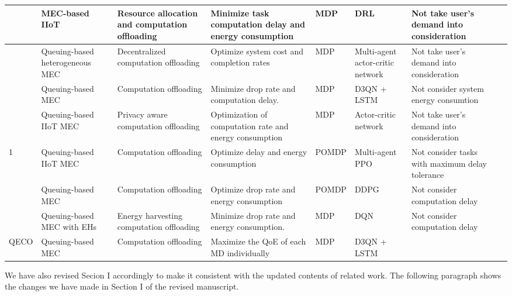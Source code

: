 \documentclass[12pt,draftclsnofoot,onecolumn]{IEEEtran}
\begin{document}
\begin{enumerate}
\begin{table}[htbp]
{{\begin{tabular}{ lp{3.4cm}p{4.5cm}p{5.2cm}p{1.7cm}p{3.1cm}p{4.6cm}l}
				\cite{gong2022edge} & MEC-based IIoT & Resource allocation and computation offloading & Minimize task computation delay and energy consumption & MDP & DRL & Not take user's demand into consideration\\\midrule
				\cite{gao2022large} & Queuing-based heterogeneous MEC & Decentralized computation offloading & Optimize system cost and completion rates & MDP & Multi-agent actor-critic network& Not take user's demand into consideration \\\midrule
				\cite{9253665} &  Queuing-based MEC &  Computation offloading & Minimize drop rate and computation delay. & MDP & D3QN + LSTM & Not consider system energy consumtion\\\midrule
				\cite{wu2024combining}  & Queuing-based IIoT MEC & Privacy aware computation offloading & Optimization of computation rate and energy consumption & MDP & Actor-critic network  & Not take user's demand into consideration \\\midrule
				\cite{wu2023multi} 1& Queuing-based IIoT MEC & Computation offloading & Optimize delay and energy consumption & POMDP & Multi-agent PPO&  Not consider tasks with maximum delay tolerance \\\midrule
				\cite{huang2021deadline} & Queuing-based MEC & Computation offloading & Optimize drop rate and energy consumption & POMDP & DDPG & Not consider computation delay \\ \midrule
				\cite{Bolourian-WCL24}  & Queuing-based MEC with EHs& Energy harvesting  computation offloading & Minimize drop rate and energy consumption. & MDP  & DQN & Not consider computation delay  \\\midrule
				QECO &  Queuing-based MEC &  Computation offloading & Maximize the QoE of each MD individually &MDP & D3QN + LSTM & \\
				\toprule
		\end{tabular}}
		\label{table111}}
\end{table}



\vspace{6mm}

We have also revised Secion I accordingly to make it consistent with the updated contents of related work. The following paragraph shows the changes we have made in Section I of the revised manuscript.


\vspace{6mm}








\end{enumerate}
\end{document}
